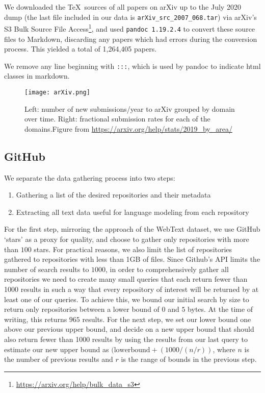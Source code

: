 \documentclass[11pt,a4paper]{article}
\begin{document}
\begin{appendices}
We downloaded the \TeX\ sources of all papers on arXiv up to the July 2020 dump (the last file included in our data is {\tt arXiv\_src\_2007\_068.tar}) via arXiv's S3 Bulk Source File Access\footnote{\url{https://arxiv.org/help/bulk_data_s3}}, and used {\tt pandoc 1.19.2.4} to convert these source files to Markdown, discarding any papers which had errors during the conversion process. This yielded a total of 1,264,405 papers.

We remove any line beginning with {\tt :::}, which is used by pandoc to indicate html classes in markdown.

\begin{figure}[ht]
  \texttt{[image: arXiv.png]}
  \caption{Left: number of new submissions/year to arXiv grouped by domain over time. Right: fractional submission rates for each of the domains.\protect\linebreak Figure from \url{https://arxiv.org/help/stats/2019_by_area/}}
  \label{fig:arXiv} %
\end{figure}

\subsection{GitHub}

We separate the data gathering process into two steps:

\begin{enumerate}  
\item Gathering a list of the desired repositories and their metadata
\item Extracting all text data useful for language modeling from each repository
\end{enumerate}


For the first step, mirroring the approach of the WebText dataset, we use GitHub ‘stars’ as a proxy for quality, and choose to gather only repositories with more than $100$ stars. For practical reasons, we also limit the list of repositories gathered to repositories with less than 1GB of files. Since Github’s API limits the number of search results to $1000$, in order to comprehensively gather all repositories we need to create many small queries that each return fewer than 1000 results in such a way that every repository of interest will be returned by at least one of our queries. To achieve this, we bound our initial search by size to return only repositories between a lower bound of $0$ and $5$ bytes. At the time of writing, this returns $965$ results. For the next step, we set our lower bound one above our previous upper bound, and decide on a new upper bound that should also return fewer than 1000 results by using the results from our last query to estimate our new upper bound as $(\mathrm{lower bound} + (1000 / (n / r))$, where $n$ is the number of previous results and $r$ is the range of bounds in the previous step.


\end{appendices}
\end{document}
